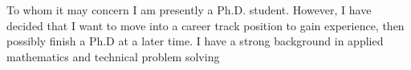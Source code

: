 \begin{rubric}{To whom it may concern}
I am presently a Ph.D. student. However, I have decided that I want to move into a career track position to gain experience, then possibly finish a Ph.D at a later time. I have a strong background in applied mathematics and technical problem solving
\end{rubric}